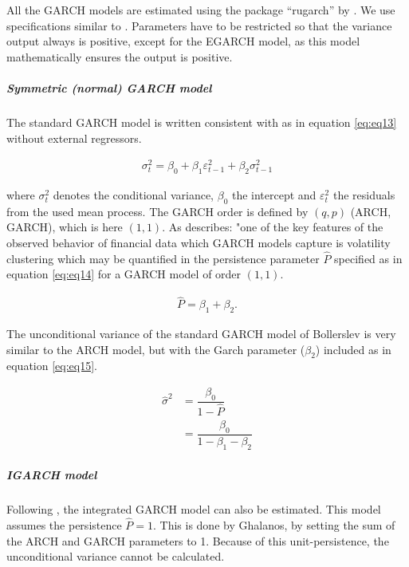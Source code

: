 \documentclass[a4paper, nobind]{templates/ociamthesis}
\begin{document}
All the GARCH models are estimated using the package ``rugarch'' by \textcite{alexios2020}. We use specifications similar to \textcite{ghalanos2020}. Parameters have to be restricted so that the variance output always is positive, except for the EGARCH model, as this model mathematically ensures the output is positive.

\hypertarget{symmetric-normal-garch-model}{%
\subparagraph{Symmetric (normal) GARCH model}\label{symmetric-normal-garch-model}}

\noindent The standard GARCH model \autocite{bollerslev1986} is written consistent with \textcite{ghalanos2020} as in equation \eqref{eq:eq13} without external regressors.

\begin{align}
\sigma_t^2 = \beta_0  +  {\beta_1}\varepsilon _{t-1}^2 + {\beta_2}\sigma_{t-1}^2
 \label{eq:eq13}
\end{align}

\noindent where \(\sigma_t^2\) denotes the conditional variance, \(\beta_0\) the intercept and \(\varepsilon_t^2\) the residuals from the used mean process. The GARCH order is defined by \((q, p)\) (ARCH, GARCH), which is here \((1, 1)\). As \textcite{ghalanos2020} describes: "one of the key features of the observed behavior of financial data which GARCH models capture is volatility clustering which may be quantified in the persistence parameter \(\hat{P}\) specified as in equation \eqref{eq:eq14} for a GARCH model of order \((1,1)\).

\begin{align}
\hat{P} =  \beta_1  + \beta_2.
 \label{eq:eq14}
\end{align}

\noindent The unconditional variance of the standard GARCH model of Bollerslev is very similar to the ARCH model, but with the Garch parameter (\(\beta_2\)) included as in equation \eqref{eq:eq15}.

\begin{equation}
\begin{split}
\hat{\sigma}^2 
&= \dfrac{\beta_0}{1 - \hat{P}} \\
&= \dfrac{\beta_0}{1 - \beta_1 - \beta_2}
\end{split}
 \label{eq:eq15}
\end{equation}

\hypertarget{igarch-model}{%
\subparagraph{IGARCH model}\label{igarch-model}}

\noindent Following \textcite{ghalanos2020}, the integrated GARCH model \autocite{bollerslev1986} can also be estimated. This model assumes the persistence \(\hat{P} = 1\). This is done by Ghalanos, by setting the sum of the ARCH and GARCH parameters to 1. Because of this unit-persistence, the unconditional variance cannot be calculated.
\end{document}
